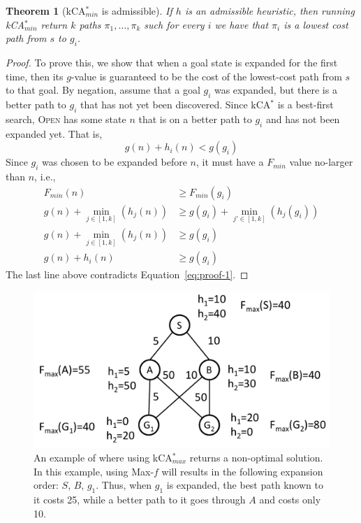 \documentclass{aicom2e}
\newtheorem{theorem}{Theorem}
\newcommand{\kastar}{kCA$^*$}
\newcommand{\kastarmin}{kCA$^*_{min}$}
\newcommand{\kastarmax}{kCA$^*_{max}$}
\newcommand{\open}{\textsc{Open}}
\begin{document}
\begin{theorem}[\kastarmin{} is admissible]
If $h$ is an admissible heuristic, then running \kastarmin{} return $k$ paths
$\pi_1,\ldots, \pi_k$ such for every $i$ we have that $\pi_i$ is a lowest cost
path from $s$ to $g_i$. \label{the:min-f}
\end{theorem}
 \begin{proof}
To prove this, we show that when a goal state is expanded for the first time,
then its $g$-value is guaranteed to be the cost of the lowest-cost path from
$s$ to that goal. By negation, assume that a goal $g_i$ was expanded, but there
is a better path to $g_i$ that has not yet been discovered. Since \kastar{} is
a best-first search, \open{} has some state $n$ that is on a better path to
$g_i$ and has not been expanded yet. That is,
\begin{equation}
g(n)+h_i(n)<g(g_i)
\label{eq:proof-1}
\end{equation}
Since $g_i$ was chosen to be expanded before $n$, it must have a $F_{min}$ value no-larger than $n$, i.e.,
\begin{align}
F_{min}(n) &\geq  F_{min}(g_i)\\
g(n)+\min_{j\in [1,k]}(h_j(n))& \geq  g(g_i)+\min_{j'\in [1,k]}(h_j(g_i))\\
g(n)+\min_{j\in [1,k]}(h_j(n))& \geq  g(g_i)\\
g(n)+h_i(n) &\geq  g(g_i)
\end{align}
The last line above contradicts Equation~\ref{eq:proof-1}.
\end{proof}



 \begin{figure}
 \includegraphics[width=\columnwidth]{max-bad_cropped.pdf}
 \caption{An example of where using \kastarmax{} returns a non-optimal solution. In this example,
 using Max-$f$ will results in the following expansion order: $S$, $B$, $g_1$.
 Thus, when $g_1$ is expanded, the best path known to it costs 25, while a
 better path to it goes through $A$ and costs only 10.}
 \label{fig:max-bad}
 \end{figure}
\end{document}

